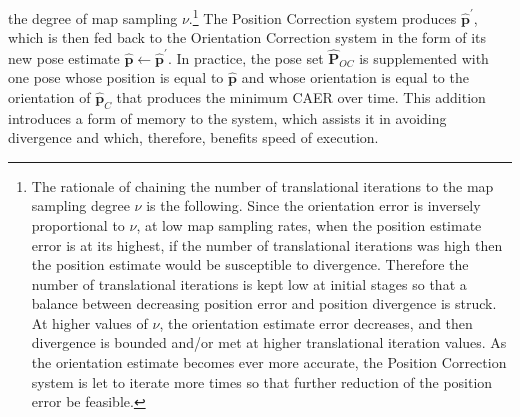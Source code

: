 the degree of map sampling $\nu$.\footnote{The rationale of chaining the number
of translational iterations to the map sampling degree $\nu$ is the following.
Since the orientation error is inversely proportional to $\nu$, at low map
sampling rates, when the position estimate error is at its highest, if the
number of translational iterations was high then the position estimate would be
susceptible to divergence. Therefore the number of translational iterations is
kept low at initial stages so that a balance between decreasing position error
and position divergence is struck. At higher values of $\nu$, the orientation
estimate error decreases, and then divergence is bounded and/or met at higher
translational iteration values.  As the orientation estimate becomes ever more
accurate, the Position Correction system is let to iterate more times so that
further reduction of the position error be feasible.} The Position Correction
system produces $\hat{\bm{p}}^\prime$, which is then fed back to the
Orientation Correction system in the form of its new pose estimate
$\hat{\bm{p}} \leftarrow \hat{\bm{p}}^\prime$. In practice, the pose set
$\hat{\bm{P}}_{OC}$ is supplemented with one pose whose position is equal to
$\hat{\bm{p}}$ and whose orientation is equal to the orientation of
$\hat{\bm{p}}_C$ that produces the minimum CAER over time. This addition
introduces a form of memory to the system, which assists it in avoiding
divergence and which, therefore, benefits speed of execution.
